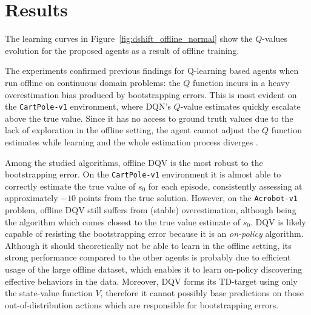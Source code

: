 \section{Results}\label{sec:results}
The learning curves in Figure~\ref{fig:dshift_offline_normal} show the
$Q$-values evolution for the proposed agents as a result of offline
training.

The experiments confirmed previous findings for Q-learning
based agents when run offline on continuous domain problems: the $Q$
function incurs in a heavy overestimation bias produced by
bootstrapping errors. This is most evident on the \texttt{CartPole-v1}
environment, where DQN's $Q$-value estimates quickly escalate above
the true value. Since it has no access to ground truth values due to
the lack of exploration in the offline setting, the agent cannot
adjust the $Q$ function estimates while learning and the whole
estimation process diverges
\citep{pmlr-v97-fujimoto19a,kumar2019stabilizing}.

Among the studied algorithms, offline DQV is the most robust to the
bootstrapping error. On the \texttt{CartPole-v1} environment it is
almost able to correctly estimate the true value of $s_0$ for each
episode, consistently assessing at approximately $-10$ points from the
true solution. However, on the \texttt{Acrobot-v1} problem, offline
DQV still suffers from (stable) overestimation, although being the
algorithm which comes closest to the true value estimate of
$s_0$. DQV is likely capable of resisting the bootstrapping error
because it is an \textit{on-policy} algorithm. Although it should
theoretically not be able to learn in the offline setting, its strong
performance compared to the other agents is probably due to efficient
usage of the large offline dataset, which enables it to learn on-policy
discovering effective behaviors in the data. Moreover, DQV forms its
TD-target using only the state-value function $V$, therefore it cannot
possibly base predictions on those out-of-distribution actions which
are responsible for bootstrapping errors.

